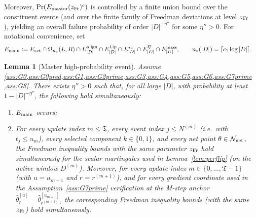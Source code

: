 \documentclass{statsoc}
\newtheorem{lemma}[lemma]{Lemma}
\newcommand{\1}{\mathbbm{1}}
\newcommand{\Tmax}{\mathfrak{T}}
\begin{document}
Moreover, $\Pr(E_{\mathrm{master}}(z_{\rm Fr})^c)$ is controlled by a finite union bound over the constituent events
(and over the finite family of Freedman deviations at level $z_{\rm Fr}$), yielding an overall failure probability
of order $|D|^{-\eta''}$ for some $\eta''>0$. For notational convenience, set
\[
E_{\rm main}
:=E_{\rm act}\cap \Omega_{n_*}(L,R)\cap E^{\rm align}_{|D|}
\cap E^{\rm Lip}_{|D|}\cap E^{\rm sc}_{|D|}\cap E^{\nabla}_{|D|}\cap E^{\rm mass}_{|D|},
\qquad n_*(|D|)=\lceil c_1\log|D|\rceil.
\]


\begin{lemma}[Master high-probability event]\label{lem:master}
Assume \cref{ass:G0,ass:G0pred,ass:G1,ass:G2prime,ass:G3,ass:G4,ass:G5,ass:G6,ass:G7prime,ass:G8}. There exists $\eta''>0$ such that, for all large $|D|$, with probability at least $1-|D|^{-\eta''}$, the following hold simultaneously:
\begin{enumerate}[nosep,label=(\roman*)]
\item $E_{\rm main}$ occurs;
\item For every update index $m\le \Tmax$, every event index $j \le N^{(m)}$ (i.e.\ with $t_j\le u_m$),
every selected component $k\in\{0,1\}$, and every net point $\theta\in\mathcal N_{\rm net}$,
the Freedman inequality bounds with the same parameter $z_{\rm Fr}$ hold simultaneously for the scalar martingales used in Lemma~\ref{lem:perflip} (on the active window $D^{(m)}$). Moreover, for every update index $m\in\{0,\dots,\Tmax-1\}$ (with $u=u_{m+1}$ and $r=r^{(m+1)}$), and for every gradient coordinate used in the Assumption~\ref{ass:G7prime} verification at the M-step anchor $\hat\theta_{r}^{[u]}=\hat\theta_{r^{(m+1)}}^{[u_{m+1}]}$, the corresponding Freedman inequality bounds (with the same $z_{\rm Fr}$) hold simultaneously.
\end{enumerate}
\end{lemma}
\end{document}
